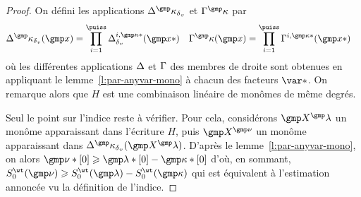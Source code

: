\begin{proof}
  On défini les applications \( \pmnum^\dermp_\dv \) et \( \pmden^\dermp \)
  par
  \begin{align}
    \pmnum^\dermp_\dv (\cmp)
    & =
    \prod\fctrange \pmnum^{\fct, \dermp*}_\dv (\cmp*)
    &
    \pmden^\dermp (\cmp)
    & =
    \prod\fctrange \pmden^{\fct, \dermp*} (\cmp*)
  \end{align}
  où les différentes applications \( \Delta \) et \( \Gamma \) des membres de
  droite sont obtenues en appliquant le lemme~\ref{l:par-anyvar-mono} à
  chacun des facteurs \( \var* \). On remarque alors que \( H \) est une
  combinaison linéaire de monômes de même degrés.

  Seul le point sur l'indice reste à vérifier. Pour cela, considérons \(
    \vmp^\imp \) un monôme apparaissant dans l'écriture \( H \), puis \(
    \vmp^{\gmp\nu} \) un monôme apparaissant dans \( \pmnum^\dermp_\dv(
    \vmp^\imp ) \). D'après le lemme~\ref{l:par-anyvar-mono}, on alors \(
    \gmp\nu*[0] \ge \imp*[0] - \dermp*[0] \) d'où, en sommant, \(
    \wtsum*(\gmp\nu) \ge \wtsum*(\imp) - \wtsum*(\dermp) \) qui est équivalent
  à l'estimation annoncée vu la définition de l'indice.
\end{proof}


\endinput

